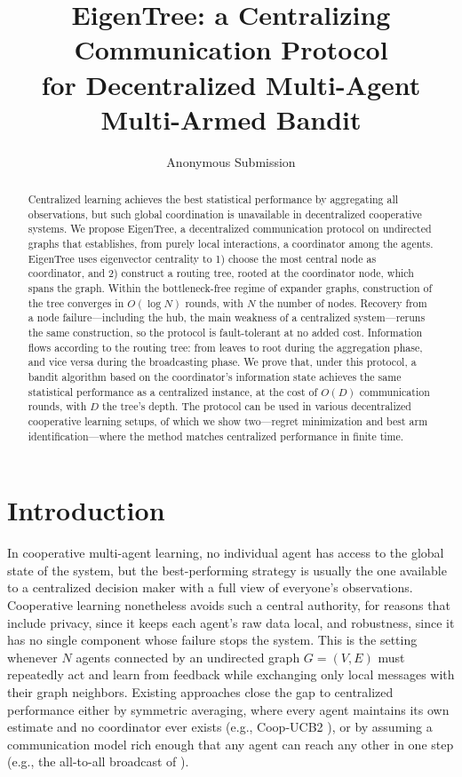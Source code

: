 \documentclass[letterpaper]{article} %
\title{EigenTree: a Centralizing Communication Protocol\\for Decentralized Multi-Agent Multi-Armed Bandit}
\author{
    Anonymous Submission
}
\begin{document}
\maketitle

\begin{abstract}
	Centralized learning achieves the best statistical performance by
	aggregating all observations, but such global coordination is unavailable
	in decentralized cooperative systems.
	We propose EigenTree, a decentralized communication protocol on undirected
	graphs that establishes, from purely local interactions, a coordinator
	among the agents.
	EigenTree uses eigenvector centrality to 1) choose the most central node as
	coordinator, and 2) construct a routing tree, rooted at the coordinator
	node, which spans the graph.
	Within the bottleneck-free regime of expander graphs, construction of the
	tree converges in $O(\log N)$ rounds, with $N$ the number of nodes. Recovery
	from a node failure---including the hub, the main weakness of a centralized
	system---reruns the same construction, so the protocol is fault-tolerant at no
	added cost.
	Information flows according to the routing tree: from leaves to root
	during the aggregation phase, and vice versa during the broadcasting phase.
	We prove that, under this protocol, a bandit algorithm based on the
	coordinator's information state achieves the same statistical performance
	as a centralized instance, at the cost of $O(D)$ communication rounds, with
	$D$ the tree's depth.
	The protocol can be used in various decentralized cooperative learning
	setups, of which we show two---regret minimization and best arm
	identification---where the method matches centralized performance in
	finite time.
\end{abstract}

\section{Introduction}

In cooperative multi-agent learning, no individual agent has access to the
global state of the system, but the best-performing strategy is usually the one
available to a centralized decision maker with a full view of everyone's
observations. Cooperative learning nonetheless avoids such a central authority,
for reasons that include privacy, since it keeps each agent's raw data local,
and robustness, since it has no single component whose failure stops the system.
This is the setting whenever $N$ agents connected by an
undirected graph $G = (V, E)$ must repeatedly act and learn from feedback while
exchanging only local messages with their graph neighbors. Existing approaches
close the gap to centralized performance either by symmetric averaging, where
every agent maintains its own estimate and no coordinator ever exists (e.g.,
Coop-UCB2 \citep{landgren2021distributed}), or by assuming a communication
model rich enough that any agent can reach any other in one step (e.g., the
all-to-all broadcast of \cite{hillel2013distributed}). 
\end{document}
